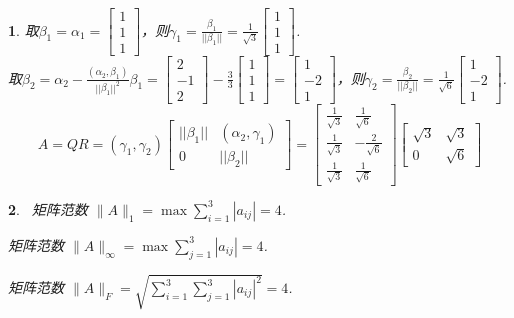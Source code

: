 \documentclass[11pt, a4paper]{article}
\newtheorem{lt}{}
\begin{document}
\begin{lt}
取$\beta_1=\alpha_1=\begin{bmatrix}
1\\1\\1\end{bmatrix}$，则$\gamma_1=\displaystyle\frac{\beta_1}{||\beta_1||}=\displaystyle\frac{1}{\sqrt3}\begin{bmatrix}
1\\1\\1\end{bmatrix}$.\\

取$\beta_2=\alpha_2-\displaystyle\frac{(\alpha_2, \beta_1)}{||\beta_1||^2}\beta_1=\begin{bmatrix}
2\\-1\\2\end{bmatrix}-\displaystyle\frac{3}{3}\begin{bmatrix}
1\\1\\1\end{bmatrix}=\begin{bmatrix}
1\\-2\\1\end{bmatrix}$，则$\gamma_2=\displaystyle\frac{\beta_2}{||\beta_2||}=\displaystyle\frac{1}{\sqrt6}\begin{bmatrix}
1\\-2\\1\end{bmatrix}$.\\

$$A=QR=(\gamma_1, \gamma_2)\begin{bmatrix}
||\beta_1||&(\alpha_2, \gamma_1)\\0&||\beta_2||
\end{bmatrix}
=\begin{bmatrix}
\displaystyle\frac{1}{\sqrt3}&\displaystyle\frac{1}{\sqrt6}\\\displaystyle\frac{1}{\sqrt3}&-\displaystyle\frac{2}{\sqrt6}\\\displaystyle\frac{1}{\sqrt3}&\displaystyle\frac{1}{\sqrt6}\end{bmatrix}
\begin{bmatrix}
\sqrt3&\sqrt3\\0&\sqrt6\end{bmatrix}$$
\end{lt}


\begin{lt}\
矩阵范数 $\|A\|_1 = \max \displaystyle\sum_{i=1}^3|a_{ij}|=4$.

矩阵范数 $\|A\|_\infty = \max \displaystyle\sum_{j=1}^3|a_{ij}|=4$.

矩阵范数 $\|A\|_F = \sqrt{\displaystyle\sum_{i=1}^3\sum_{j=1}^3|a_{ij}|^2}=4$.
\end{lt}
\end{document}
